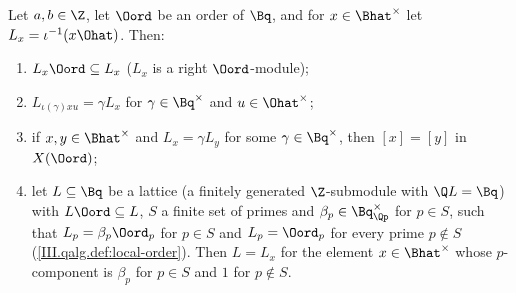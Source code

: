 Let $a,b\in\Z$, let $\Oord$ be an order of $\Bq$, and for $x\in\Bhat^\times$ let $L_x=\iota^{-1}(x\Ohat)$. Then:
\begin{enumerate}[label=(\alph*)]
\item $L_x\Oord\subseteq L_x$ ($L_x$ is a right $\Oord$-module);
\item $L_{\iota(\gamma)xu}=\gamma L_x$ for $\gamma\in\Bq^\times$ and $u\in\Ohat^\times$;
\item if $x,y\in\Bhat^\times$ and $L_x=\gamma L_y$ for some $\gamma\in\Bq^\times$, then $[x]=[y]$ in $X(\Oord)$;
\item let $L\subseteq\Bq$ be a lattice (a finitely generated $\Z$-submodule with $\Q L=\Bq$) with $L\Oord\subseteq L$, $S$ a finite set of primes and $\beta_p\in\Bq_{\Qp}^\times$
  for $p\in S$, such that $L_p=\beta_p\Oord_p$ for $p\in S$ and $L_p=\Oord_p$ for every prime $p\notin S$ (\cref{III.qalg.def:local-order}). Then
  $L=L_x$ for the element $x\in\Bhat^\times$ whose $p$-component is $\beta_p$ for $p\in S$ and $1$ for $p\notin S$.
\end{enumerate}
